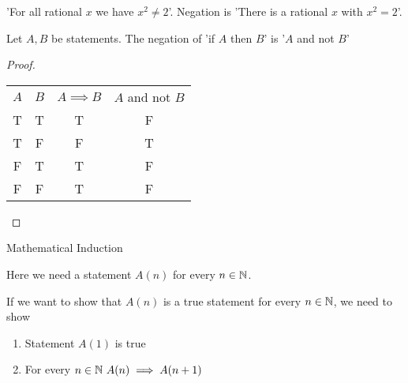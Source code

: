 \documentclass[10pt, a4paper]{article}
\begin{document}
\begin{example}
    'For all rational $x$ we have $x ^ 2 \neq 2$'. Negation is 'There is a rational $x$ with $x ^ 2 = 2$'.
\end{example}

\begin{proposition}
    Let $A, B$ be statements. The negation of 'if $A$ then $B$' is '$A$ and not $B$'
    \begin{proof}
        \begin{table}[h!]
            \centering
            \begin{tabular}{cccc}
                $A$ & $B$ & $A \implies B$ & $A$ and not $B$ \\
                 T & T & T & F \\
                 T & F & F & T \\
                 F & T & T & F \\
                 F & F & T & F \\
            \end{tabular}
        \end{table}
    \end{proof}
\end{proposition}

Mathematical Induction

Here we need a statement $A(n)$ for every $n \in \mathbb{N}$.

If we want to show that $A(n)$ is a true statement for every $n \in \mathbb{N}$, we need to show
\begin{enumerate}[label = (I\arabic*)]
    \item Statement $A(1)$ is true
    \item For every $n \in \mathbb{N}\ A(n) \implies A(n + 1)$
\end{enumerate}
\end{document}
